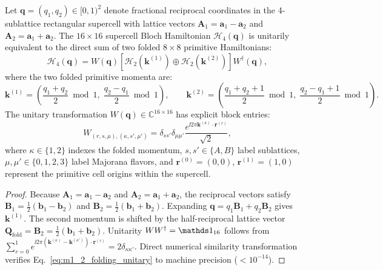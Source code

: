 \begin{theorem}
\label{thm:m1_2_folding_equivalence}
Let $\mathbf{q} = (q_1, q_2) \in [0, 1)^2$ denote fractional reciprocal coordinates in the 4-sublattice rectangular supercell with lattice vectors $\mathbf{A}_1 = \mathbf{a}_1 - \mathbf{a}_2$ and $\mathbf{A}_2 = \mathbf{a}_1 + \mathbf{a}_2$. The $16 \times 16$ supercell Bloch Hamiltonian $\mathcal{H}_4(\mathbf{q})$ is unitarily equivalent to the direct sum of two folded $8 \times 8$ primitive Hamiltonians:
\begin{equation}
\label{eq:m1_2_folding_unitary}
\mathcal{H}_4(\mathbf{q}) = W(\mathbf{q}) \left[ \mathcal{H}_2(\mathbf{k}^{(1)}) \oplus \mathcal{H}_2(\mathbf{k}^{(2)}) \right] W^\dagger(\mathbf{q}),
\end{equation}
where the two folded primitive momenta are:
\begin{equation}
\label{eq:m1_2_folded_momenta}
\mathbf{k}^{(1)} = \left(\frac{q_1 + q_2}{2} \bmod 1, \; \frac{q_2 - q_1}{2} \bmod 1\right), \qquad \mathbf{k}^{(2)} = \left(\frac{q_1 + q_2 + 1}{2} \bmod 1, \; \frac{q_2 - q_1 + 1}{2} \bmod 1\right).
\end{equation}
The unitary transformation $W(\mathbf{q}) \in \mathbb{C}^{16 \times 16}$ has explicit block entries:
\begin{equation}
\label{eq:m1_2_W_matrix}
W_{(r, s, \mu), (\kappa, s', \mu')} = \delta_{ss'} \delta_{\mu\mu'} \frac{e^{\ii 2\pi \mathbf{k}^{(\kappa)} \cdot \mathbf{r}^{(r)}}}{\sqrt{2}},
\end{equation}
where $\kappa \in \{1, 2\}$ indexes the folded momentum, $s, s' \in \{A, B\}$ label sublattices, $\mu, \mu' \in \{0, 1, 2, 3\}$ label Majorana flavors, and $\mathbf{r}^{(0)} = (0, 0)$, $\mathbf{r}^{(1)} = (1, 0)$ represent the primitive cell origins within the supercell.
\end{theorem}
\begin{proof}
Because $\mathbf{A}_1 = \mathbf{a}_1 - \mathbf{a}_2$ and $\mathbf{A}_2 = \mathbf{a}_1 + \mathbf{a}_2$, the reciprocal vectors satisfy $\mathbf{B}_1 = \frac{1}{2}(\mathbf{b}_1 - \mathbf{b}_2)$ and $\mathbf{B}_2 = \frac{1}{2}(\mathbf{b}_1 + \mathbf{b}_2)$. Expanding $\mathbf{q} = q_1 \mathbf{B}_1 + q_2 \mathbf{B}_2$ gives $\mathbf{k}^{(1)}$. The second momentum is shifted by the half-reciprocal lattice vector $\mathbf{Q}_{\mathrm{fold}} = \mathbf{B}_2 = \frac{1}{2}(\mathbf{b}_1 + \mathbf{b}_2)$. Unitarity $W W^\dagger = \Id_{16}$ follows from $\sum_{r=0}^1 e^{\ii 2\pi (\mathbf{k}^{(\kappa)} - \mathbf{k}^{(\kappa')}) \cdot \mathbf{r}^{(r)}} = 2 \delta_{\kappa\kappa'}$. Direct numerical similarity transformation verifies Eq.~\eqref{eq:m1_2_folding_unitary} to machine precision ($< 10^{-14}$).
\end{proof}
